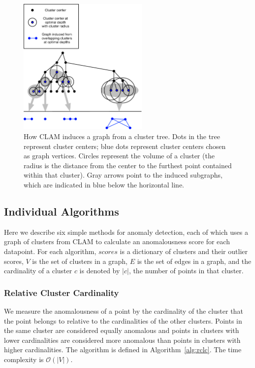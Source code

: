 \begin{figure}[ht!]
    \centering
    \includegraphics[width=2.5in]{images/tree-graph.pdf}
    \caption{How CLAM induces a graph from a cluster tree.
        Dots in the tree represent cluster centers;
        blue dots represent cluster centers chosen as graph vertices.
        Circles represent the volume of a cluster (the radius is the distance from the center to the furthest point contained within that cluster).
        Gray arrows point to the induced subgraphs, which are indicated in blue below the horizontal line.}
    \label{fig:methods:graph-generation}
\end{figure}


\subsection{Individual Algorithms}
\label{subsec:methods:individual-algorithms}

Here we describe six simple methods for anomaly detection, each of which uses a graph of clusters from CLAM to calculate an anomalousness score for each datapoint.
For each algorithm, $scores$ is a dictionary of clusters and their outlier scores,
$V$ is the set of clusters in a graph,
$E$ is the set of edges in a graph, and
the cardinality of a cluster $c$ is denoted by $|c|$, the number of points in that cluster.

\subsubsection{Relative Cluster Cardinality}
We measure the anomalousness of a point by the cardinality of the cluster that the point belongs to relative to the cardinalities of the other clusters.
Points in the same cluster are considered equally anomalous and points in clusters with lower cardinalities are considered more anomalous than points in clusters with higher cardinalities.
The algorithm is defined in Algorithm~\ref{alg:rclc}.
The time complexity is $\mathcal{O}(|V|)$.

